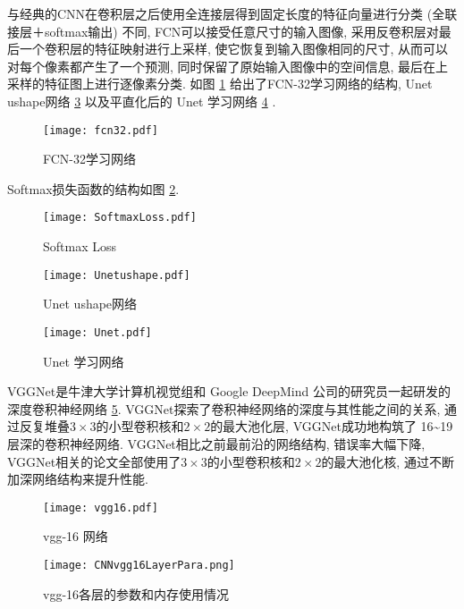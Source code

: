与经典的CNN在卷积层之后使用全连接层得到固定长度的特征向量进行分类 (全联接层＋softmax输出) 不同, FCN可以接受任意尺寸的输入图像, 采用反卷积层对最后一个卷积层的特征映射进行上采样,
使它恢复到输入图像相同的尺寸, 从而可以对每个像素都产生了一个预测, 同时保留了原始输入图像中的空间信息, 最后在上采样的特征图上进行逐像素分类.
如图 \ref{CNNfcn320203} 给出了FCN-32学习网络的结构, Unet ushape网络 \ref{CNNUnetushape0203} 以及平直化后的 Unet 学习网络 \ref{CNNUnet0203} .
\begin{figure}[H]
    \centering
    \texttt{[image: fcn32.pdf]}
    \caption{FCN-32学习网络}
    \label{CNNfcn320203}
    \vspace{-0.4cm}
\end{figure}

Softmax损失函数的结构如图 \ref{CNNSoftmaxLoss0203}.
\begin{figure}[H]
    \centering
    \texttt{[image: SoftmaxLoss.pdf]}
    \caption{Softmax Loss}
    \label{CNNSoftmaxLoss0203}
    \vspace{-0.4cm}
\end{figure}
\begin{figure}[H]
    \centering
    \texttt{[image: Unetushape.pdf]}
    \caption{Unet ushape网络}
    \label{CNNUnetushape0203}
    \vspace{-0.4cm}
\end{figure}
\begin{figure}[H]
    \centering
    \texttt{[image: Unet.pdf]}
    \caption{Unet 学习网络}
    \label{CNNUnet0203}
    \vspace{-0.4cm}
\end{figure}
VGGNet是牛津大学计算机视觉组和 Google DeepMind 公司的研究员一起研发的深度卷积神经网络 \ref{CNNvgg16020301}.
VGGNet探索了卷积神经网络的深度与其性能之间的关系, 通过反复堆叠$3\times 3$的小型卷积核和$2\times 2$的最大池化层,
VGGNet成功地构筑了 16\textasciitilde 19 层深的卷积神经网络.
VGGNet相比之前最前沿的网络结构, 错误率大幅下降,
VGGNet相关的论文全部使用了$3\times 3$的小型卷积核和$2\times 2$的最大池化核, 通过不断加深网络结构来提升性能.
\begin{figure}[H]
    \centering
    \texttt{[image: vgg16.pdf]}
    \caption{vgg-16 网络}
    \label{CNNvgg16020301}\vspace{-0.4cm}
\end{figure}
\begin{figure}[H]
    \centering
    \texttt{[image: CNNvgg16LayerPara.png]}
    \caption{vgg-16各层的参数和内存使用情况}
    \label{CNNvgg16LayerPara020302}
    \vspace{-0.4cm}
\end{figure}
